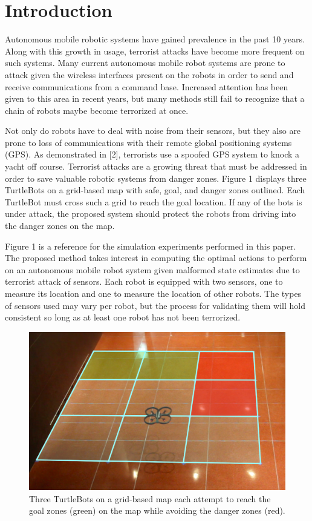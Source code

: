\documentclass[conference]{IEEEtran}
\begin{document}
\section{Introduction}
Autonomous mobile robotic systems have gained prevalence in the past 10 years. Along with this
growth in usage, terrorist attacks have become more frequent on such systems. Many current autonomous mobile robot systems are prone to attack given the wireless interfaces present on the robots in order to send and receive communications from a command base. Increased attention has been given to this area in recent years, but many methods still fail to recognize that a chain of robots maybe become terrorized at once.
\par
Not only do robots have to deal with noise from their sensors, but they also are prone to loss of communications with their remote global positioning systems (GPS). As demonstrated in [2], terrorists use a spoofed GPS system to knock a yacht off course. Terrorist attacks are a growing threat that must be addressed in order to save valuable robotic systems from danger zones. Figure 1 displays three TurtleBots on a grid-based map with safe, goal, and danger zones outlined. Each TurtleBot must cross such a grid to reach the goal location. If any of the bots is under attack, the proposed system should protect the robots from driving into the danger zones on the map.
\par 
Figure 1 is a reference for the simulation experiments performed in this paper. The proposed method takes interest in computing the optimal actions to perform on an autonomous mobile robot system given malformed state estimates due to terrorist attack of sensors. Each robot is equipped with two sensors, one to measure its location and one to measure the location of other robots. The types of sensors used may vary per robot, but the process for validating them will hold consistent so long as at least one robot has not been terrorized.
\par
\begin{figure}[!ht]
  \centering
    \includegraphics[scale=.2]{figure1}
  \caption{Three TurtleBots on a grid-based map each attempt to reach the goal zones (green) on the map while avoiding the danger zones (red).}
\end{figure}
\end{document}
